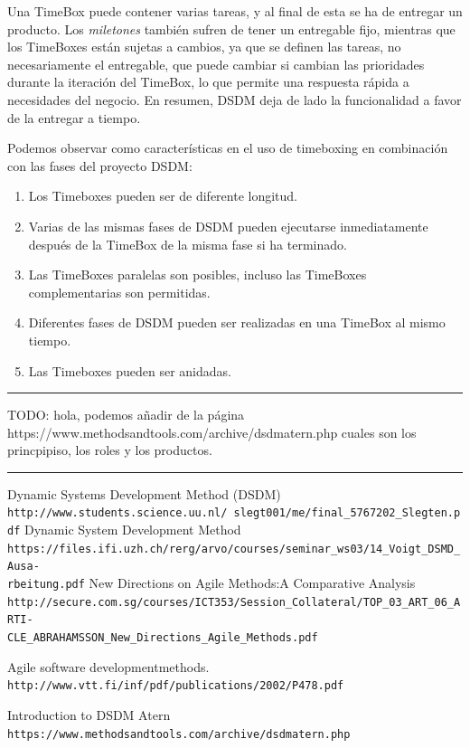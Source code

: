 \documentclass[12pt,a4paper]{article}
\begin{document}
 Una TimeBox puede contener varias tareas, y al final de esta se ha de entregar un producto. Los \emph{miletones} también
sufren de tener un entregable fijo, mientras que los TimeBoxes están sujetas a cambios, ya que se definen las tareas, no necesariamente el entregable, que puede cambiar si cambian las prioridades durante la iteración del TimeBox, lo que permite una respuesta rápida a necesidades del negocio. En resumen, DSDM deja de lado la funcionalidad a favor de la entregar a tiempo.

Podemos observar como características en el uso de timeboxing en combinación con las fases del proyecto DSDM:
\begin{enumerate}
	\item  Los Timeboxes pueden ser de diferente longitud.
	\item  Varias de las mismas fases de DSDM pueden ejecutarse inmediatamente después de la TimeBox de la misma fase si ha terminado.
\item Las TimeBoxes paralelas son posibles, incluso las TimeBoxes complementarias son permitidas.
\item Diferentes fases de DSDM pueden ser realizadas en una TimeBox al mismo tiempo.
\item Las Timeboxes pueden ser anidadas.
\end{enumerate}


{\color{red} \rule{\linewidth}{0.5mm} }
{\color{blue} TODO: hola, podemos añadir de la página https://www.methodsandtools.com/archive/dsdmatern.php cuales son los princpipiso, los roles y los productos.}\\
{\color{red} \rule{\linewidth}{0.5mm} }

\begin{thebibliography}{9}

 Dynamic Systems Development Method (DSDM)
\\\texttt{http://www.students.science.uu.nl/~slegt001/me/final\_5767202\_Slegten.pdf}
Dynamic System Development Method
\\\texttt{https://files.ifi.uzh.ch/rerg/arvo/courses/seminar\_ws03/14\_Voigt\_DSMD\_Ausa-\\rbeitung.pdf}
New Directions on Agile Methods:A Comparative Analysis
\\\texttt{http://secure.com.sg/courses/ICT353/Session\_Collateral/TOP\_03\_ART\_06\_ARTI-\\CLE\_ABRAHAMSSON\_New\_Directions\_Agile\_Methods.pdf}

Agile software developmentmethods.
\\\texttt{http://www.vtt.fi/inf/pdf/publications/2002/P478.pdf}


Introduction to DSDM Atern
\\\texttt{https://www.methodsandtools.com/archive/dsdmatern.php}
\end{thebibliography}
\end{document}
